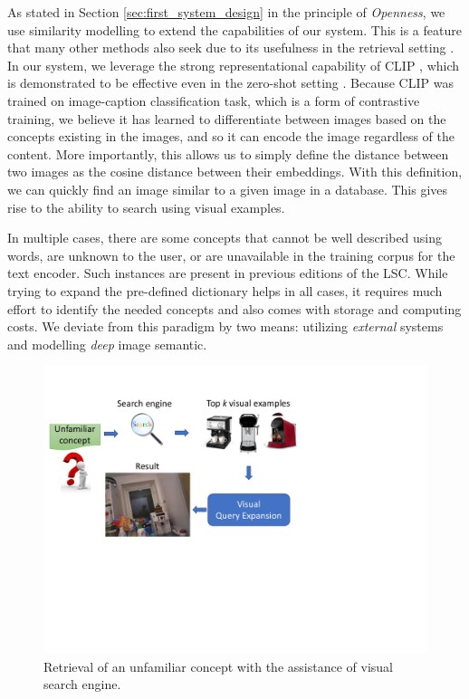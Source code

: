 As stated in Section \ref{sec:first_system_design} in the principle of \textit{Openness}, we use similarity modelling to extend the capabilities of our system. This is a feature that many other methods also seek due to its usefulness in the retrieval setting \cite{nguyen_lifeseeker_2022} \cite{lokoc_enhanced_2021}. In our system, we leverage the strong representational capability of CLIP \cite{radford_learning_2021}, which is demonstrated to be effective even in the zero-shot setting \cite{portillo-quintero_straightforward_2021}. Because CLIP was trained on image-caption classification task, which is a form of contrastive training, we believe it has learned to differentiate between images based on the concepts existing in the images, and so it can encode the image regardless of the content. More importantly, this allows us to simply define the distance between two images as the cosine distance between their embeddings. With this definition, we can quickly find an image similar to a given image in a database. This gives rise to the ability to search using visual examples.

In multiple cases, there are some concepts that cannot be well described using words, are unknown to the user, or are unavailable in the training corpus for the text encoder. Such instances are present in previous editions of the LSC. While trying to expand the pre-defined dictionary helps in all cases, it requires much effort to identify the needed concepts and also comes with storage and computing costs. We deviate from this paradigm by two means: utilizing \textit{external} systems and modelling \textit{deep} image semantic.


\begin{figure}[]
    \centering
    \vspace{-2mm}
    \includegraphics[width=0.9\columnwidth]{content/resources/images/methods/VisualQueryExpansion.pdf}
    \caption{Retrieval of an unfamiliar concept with the assistance of visual search engine.}
    \label{fig:VisualQueryExpansion}
\end{figure}

